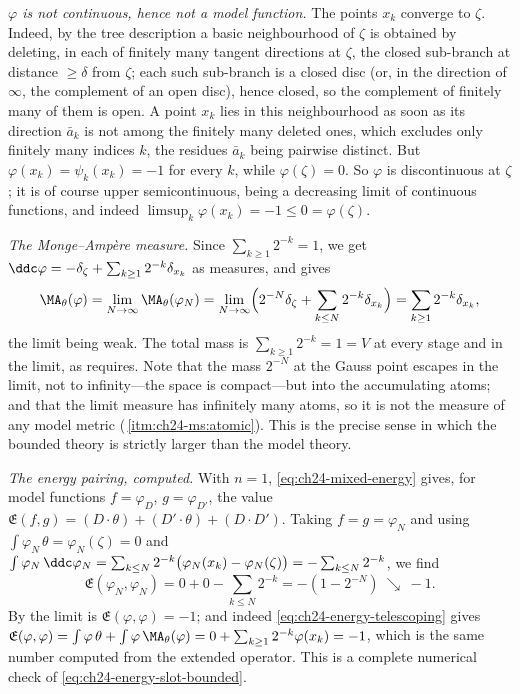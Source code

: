 \begin{example}
\emph{\(\varphi\) is not continuous, hence not a model function.}  The
points \(x_k\) converge to \(\zeta\).  Indeed, by the tree description
 a basic neighbourhood of \(\zeta\) is obtained by
deleting, in each of finitely many tangent directions at \(\zeta\), the
closed sub-branch at distance \(\geq\delta\) from \(\zeta\); each such
sub-branch is a closed disc (or, in the direction of \(\infty\), the
complement of an open disc), hence closed, so the complement of finitely
many of them is open.  A point \(x_k\) lies in this neighbourhood as soon as
its direction \(\bar a_k\) is not among the finitely many deleted ones, which
excludes only finitely many indices \(k\), the residues \(\bar a_k\) being
pairwise distinct.
But \(\varphi(x_k)=\psi_k(x_k)=-1\) for every \(k\), while
\(\varphi(\zeta)=0\).  So \(\varphi\) is discontinuous at \(\zeta\); it is
of course upper semicontinuous, being a decreasing limit of continuous
functions, and indeed \(\limsup_k\varphi(x_k)=-1\leq0=\varphi(\zeta)\).

\emph{The Monge--Amp\`ere measure.}  Since
\(\sum_{k\geq1}2^{-k}=1\), we get \(\ddc\varphi=-\delta_\zeta
+\sum_{k\geq1}2^{-k}\delta_{x_k}\) as measures, and
 gives
\begin{equation}
\label{eq:ch24-branch-measure}
 \MA_\theta(\varphi)
 =\lim_{N\to\infty}\MA_\theta(\varphi_N)
 =\lim_{N\to\infty}\Bigl(2^{-N}\delta_\zeta
   +\sum_{k\leq N}2^{-k}\delta_{x_k}\Bigr)
 =\sum_{k\geq1}2^{-k}\delta_{x_k},
\end{equation}
the limit being weak.  The total mass is
\(\sum_{k\geq1}2^{-k}=1=V\) at every stage and in the limit, as
 requires.  Note that the mass \(2^{-N}\) at
the Gauss point escapes in the limit, not to infinity---the space is
compact---but into the accumulating atoms; and that the limit measure has
infinitely many atoms, so it is not the measure of any model metric
(\,\cref{itm:ch24-ms:atomic}).  This is the
precise sense in which the bounded theory is strictly larger than the model
theory.

\emph{The energy pairing, computed.}  With \(n=1\),
\eqref{eq:ch24-mixed-energy} gives, for model functions \(f=\varphi_D\),
\(g=\varphi_{D'}\), the value
\(\mathfrak E(f,g)=(D\cdot\theta)+(D'\cdot\theta)+(D\cdot D')\).  Taking
\(f=g=\varphi_N\) and using
\(\int\varphi_N\,\theta=\varphi_N(\zeta)=0\) and
\(\int\varphi_N\,\ddc\varphi_N
 =\sum_{k\leq N}2^{-k}\bigl(\varphi_N(x_k)-\varphi_N(\zeta)\bigr)
 =-\sum_{k\leq N}2^{-k}\),
we find
\[
 \mathfrak E(\varphi_N,\varphi_N)=0+0-\sum_{k\leq N}2^{-k}
 =-(1-2^{-N})
 \ \searrow\ -1 .
\]
By  the limit is
\(\mathfrak E(\varphi,\varphi)=-1\); and indeed
\eqref{eq:ch24-energy-telescoping} gives
\(\mathfrak E(\varphi,\varphi)=\int\varphi\,\theta
 +\int\varphi\,\MA_\theta(\varphi)
 =0+\sum_{k\geq1}2^{-k}\varphi(x_k)=-1\), which is the same number
computed from the extended operator.  This is a complete numerical check of
\eqref{eq:ch24-energy-slot-bounded}.


\end{example}

